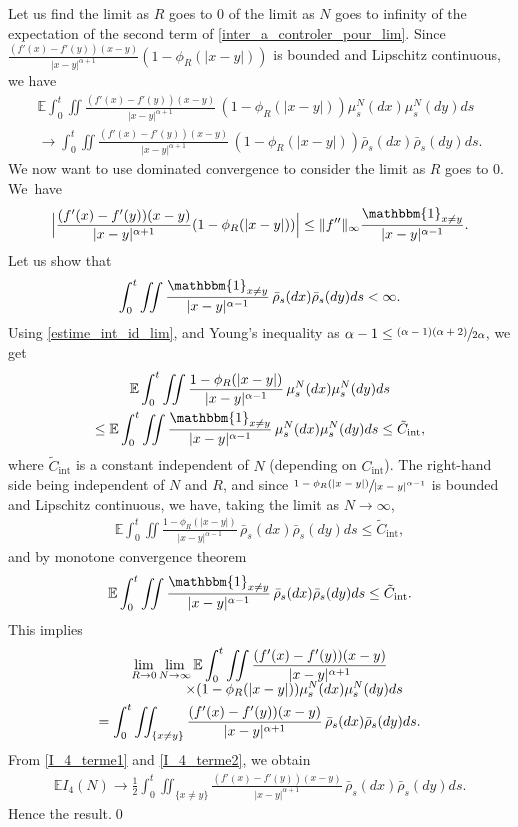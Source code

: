 \documentclass[10pt]{amsart}
\let\mathds\mathbbm
\newcommand{\rint}{\mathrm{int}}
\theoremstyle{plain}
\theoremstyle{definition}
\begin{document}
Let us find the limit as $R$ goes to 0 of the limit as $N$ goes to infinity of the expectation of the second term of \eqref{inter_a_controler_pour_lim}. Since $\frac{(f'(x)-f'(y))(x-y)}{|x-y|^{\alpha+1}}(1-\phi_R(|x-y|))$ is bounded and Lipschitz continuous, we have
\begin{multline*}
\mathbb{E}\int_{0}^t\iint\frac{(f'(x)-f'(y))(x-y)}{|x-y|^{\alpha+1}}\,(1-\phi_R(|x-y|))\mu^N_s(dx)\mu^N_s(dy)ds\\
\to\int_{0}^t\iint\frac{(f'(x)-f'(y))(x-y)}{|x-y|^{\alpha+1}}\,(1-\phi_R(|x-y|))\bar{\rho}_s(dx)\bar{\rho}_s(dy)ds.
\end{multline*}
We now want to use dominated convergence to consider the limit as $R$ goes to $0$. We~have
\begin{align*}
\Bigl|\frac{(f'(x)-f'(y))(x-y)}{|x-y|^{\alpha+1}}(1-\phi_R(|x-y|))\Bigr|\leq \|f''\|_{\infty} \frac{\mathds{1}_{x\neq y}}{|x-y|^{\alpha-1}}.
\end{align*}
Let us show that
\[
\int_{0}^t\iint\frac{\mathds{1}_{x\neq y}}{|x-y|^{\alpha-1}}\,\bar{\rho}_s(dx)\bar{\rho}_s(dy)ds<\infty.
\]
Using \eqref{estime_int_id_lim}, and Young's inequality as ${\alpha-1\leq\sfrac{(\alpha-1)(\alpha+2)}{2\alpha}}$, we get
\begin{multline*}
\mathbb{E}\int_{0}^t\iint\frac{1-\phi_R(|x-y|)}{|x-y|^{\alpha-1}}\,\mu^N_s(dx)\mu^N_s(dy)ds\\
\leq \mathbb{E}\int_{0}^t\iint\frac{\mathds{1}_{x\neq y}}{|x-y|^{\alpha-1}}\,\mu^N_s(dx)\mu^N_s(dy)ds\leq \tilde{C}_{\rint},
\end{multline*}
where $\tilde{C}_{\rint}$ is a constant independent of $N$ (depending on $C_{\rint}$). The right-hand side being independent of $N$ and $R$, and since $\sfrac{1-\phi_R(|x-y|)}{|x-y|^{\alpha-1}}$ is bounded and Lipschitz continuous, we have, taking the limit as $N\to\infty$,
\begin{align*}
\mathbb{E}\int_{0}^t\iint\frac{1-\phi_R(|x-y|)}{|x-y|^{\alpha-1}}\,\bar{\rho}_s(dx)\bar{\rho}_s(dy)ds\leq \tilde{C}_{\rint},
\end{align*}
and by monotone convergence theorem
\begin{align*}
\mathbb{E}\int_{0}^t\iint\frac{\mathds{1}_{x\neq y}}{|x-y|^{\alpha-1}}\,\bar{\rho}_s(dx)\bar{\rho}_s(dy)ds\leq \tilde{C}_{\rint}.
\end{align*}
This implies
\begin{multline}
\lim_{R\to 0}\lim_{N\to \infty}\mathbb{E}\int_{0}^t\iint\frac{(f'(x)-f'(y))(x-y)}{|x-y|^{\alpha+1}}\\[-5pt]
\shoveright{\times(1-\phi_R(|x-y|))\mu^N_s(dx)\mu^N_s(dy)ds\hphantom{.}}\\
=\int_{0}^t\iint_{\{x\neq y\}}\frac{(f'(x)-f'(y))(x-y)}{|x-y|^{\alpha+1}}\,\bar{\rho}_s(dx)\bar{\rho}_s(dy)ds\label{I_4_terme2}.
\end{multline}
From \eqref{I_4_terme1} and \eqref{I_4_terme2}, we obtain
\begin{align*}
\mathbb{E}I_4(N)\to\frac{1}{2}\int_{0}^t\iint_{\{x\neq y\}}\frac{(f'(x)-f'(y))(x-y)}{|x-y|^{\alpha+1}}\,\bar{\rho}_s(dx)\bar{\rho}_s(dy)ds.
\end{align*}
Hence the result.\qed
\end{document}
